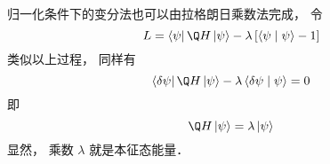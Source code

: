 归一化条件下的变分法也可以由拉格朗日乘数法完成， 令
 \begin{equation}
L = \left\langle \psi  \right|\Q H\left| \psi  \right\rangle  - \lambda \left[ {\left\langle {\psi }
 \mathrel{\left | {\vphantom {\psi  \psi }}
 \right. \kern-\nulldelimiterspace}
 {\psi } \right\rangle  - 1} \right]
\end{equation}
类似以上过程， 同样有
 \begin{equation}
\left\langle {\delta \psi } \right|\Q H\left| \psi  \right\rangle  - \lambda \left\langle {\delta \psi }
 \mathrel{\left | {\vphantom {{\delta \psi } \psi }}
 \right. \kern-\nulldelimiterspace}
 {\psi } \right\rangle  = 0
\end{equation}
即
 \begin{equation}
\Q H\left| \psi  \right\rangle  = \lambda \left| \psi  \right\rangle 
\end{equation}
显然， 乘数 $\lambda $ 就是本征态能量．

